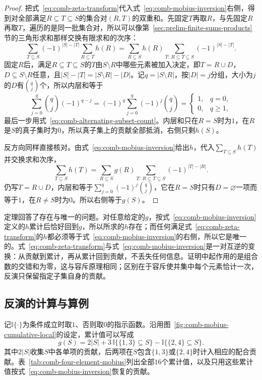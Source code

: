 \begin{proof}
把式~\eqref{eq:comb-zeta-transform}代入式~\eqref{eq:comb-mobius-inversion}右侧，得到对全部满足$R\subseteq T\subseteq S$的集合对$(R,T)$的双重和。先固定$T$再取$R$，与先固定$R$再取$T$，遍历的是同一批集合对，所以可以像第~\ref{sec:prelim-finite-sums-products}节的三角形求和那样交换有限求和的次序：
\[
  \sum_{T\subseteq S}(-1)^{|S|-|T|}\sum_{R\subseteq T}h(R)
  =\sum_{R\subseteq S}h(R)\sum_{T:\,R\subseteq T\subseteq S}(-1)^{|S|-|T|}.
\]
固定$R$后，满足$R\subseteq T\subseteq S$的$T$由$S\setminus R$中哪些元素被加入决定，即$T=R\cup D$，$D\subseteq S\setminus R$任意，且$|S|-|T|=|S\setminus R|-|D|$。记$q=|S\setminus R|$，按$|D|=j$分组，大小为$j$的$D$有$\binom qj$个，所以内层和等于
\[
  \sum_{j=0}^{q}\binom qj(-1)^{q-j}=(-1)^q\sum_{j=0}^{q}(-1)^j\binom qj
  =\begin{cases}1,&q=0,\\0,&q\geq1,\end{cases}
\]
最后一步用式~\eqref{eq:comb-alternating-subset-count}。内层和只在$R=S$时为$1$，在$R$是$S$的真子集时为$0$，所以真子集上的贡献全部抵消，右侧只剩$h(S)$。

反方向同样直接核对。由式~\eqref{eq:comb-mobius-inversion}给出$h$，代入$\sum_{T\subseteq S}h(T)$并交换求和次序，
\[
  \sum_{T\subseteq S}h(T)=\sum_{R\subseteq S}g(R)\sum_{T:\,R\subseteq T\subseteq S}(-1)^{|T|-|R|}.
\]
仍写$T=R\cup D$，内层和等于$\sum_{j=0}^{q}(-1)^j\binom qj$，它在$R=S$时只有$D=\varnothing$一项而等于$1$，在$R\neq S$时为$0$。所以右侧等于$g(S)$。
\end{proof}

定理回答了存在与唯一的问题。对任意给定的$g$，按式~\eqref{eq:comb-mobius-inversion}定义的$h$累计后恰好回到$g$，所以所求的$h$存在；而任何满足式~\eqref{eq:comb-zeta-transform}的$h$都必须等于式~\eqref{eq:comb-mobius-inversion}的右侧，所以它是唯一的。式~\eqref{eq:comb-zeta-transform}与式~\eqref{eq:comb-mobius-inversion}是一对互逆的变换：从贡献到累计，再从累计回到贡献，不丢失任何信息。证明中起作用的是组合数的交错和为零，这与容斥原理相同；区别在于容斥使并集中每个元素恰计一次，反演只保留指定子集自身的贡献。


\subsection{反演的计算与算例}
\label{sec:graph-setfn-mobius-computation}

记$\mathbb I\{\cdot\}$为条件成立时取$1$、否则取$0$的指示函数。沿用图~\ref{fig:comb-mobius-cumulative-local}的设定，累计值可以写成
\[
  g(S)=2|S|+3\,\mathbb I\{\{1,3\}\subseteq S\}-\mathbb I\{\{2,4\}\subseteq S\}.
\]
其中$2|S|$收集$S$中各单项的贡献，后两项在$S$包含$\{1,3\}$或$\{2,4\}$时计入相应的配合贡献。表~\ref{tab:comb-four-element-mobius}列出全部$16$个累计值，以及只用这些累计值按式~\eqref{eq:comb-mobius-inversion}恢复的贡献。


